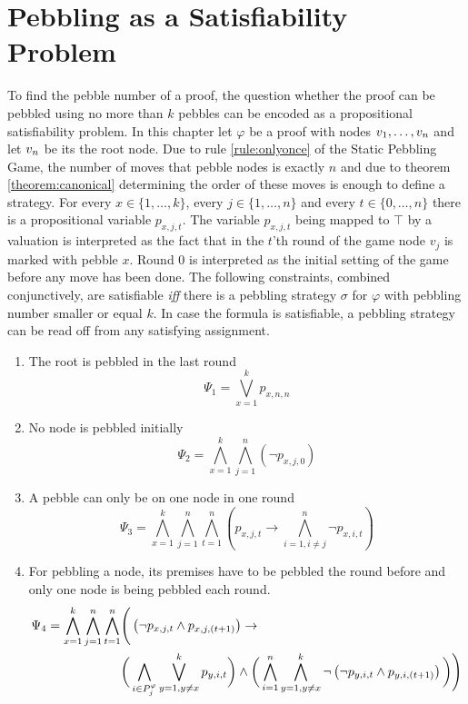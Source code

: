 \section{Pebbling as a Satisfiability Problem}
\label{sec:pebblingSAT}

To find the pebble number of a proof, the question whether the proof can be pebbled using no more than $k$ pebbles can be encoded as a propositional satisfiability problem.
In this chapter let $\varphi$ be a proof with nodes $v_1,\ldots,v_n$ and let $v_n$ be its the root node. 
Due to rule \ref{rule:onlyonce} of the Static Pebbling Game, the number of moves that pebble nodes is exactly $n$ and due to theorem \ref{theorem:canonical} determining the order of these moves is enough to define a strategy. 
For every $x \in \{1,\ldots,k\}$, every $j \in \{1,\ldots,n\}$ and every $t \in \{0,\ldots,n\}$ there is a propositional variable $p_{x,j,t}$. 
The variable $p_{x,j,t}$ being mapped to $\top$ by a valuation is interpreted as the fact that in the $t$'th round of the game node $v_j$ is marked with pebble $x$.
Round $0$ is interpreted as the initial setting of the game before any move has been done.
The following constraints, combined conjunctively, are satisfiable \textit{iff} there is a pebbling strategy $\sigma$ for $\varphi$ with pebbling number smaller or equal $k$. 
In case the formula is satisfiable, a pebbling strategy can be read off from any satisfying assignment.

\begin{enumerate}
	\item The root is pebbled in the last round
				$$\Psi_1 = \bigvee_{x = 1}^k p_{x,n,n}$$
				
	\item No node is pebbled initially\\
				$$\Psi_2 = \bigwedge_{x = 1}^k \bigwedge_{j = 1}^n \left(\neg p_{x,j,0} \right)$$

	\item A pebble can only be on one node in one round
				$$\Psi_3 = \bigwedge_{x = 1}^k \bigwedge_{j = 1}^n \bigwedge_{t = 1}^n \left( p_{x,j,t} \rightarrow \bigwedge_{i = 1, i \neq j}^n \neg p_{x,i,t} \right)$$ 
				
	\item \label{c:pebble} For pebbling a node, its premises have to be pebbled the round before and only one node is being pebbled each round.\\
				\begin{align*}
					\Psi_4 = \bigwedge_{x = 1}^k \bigwedge_{j = 1}^n \bigwedge_{t = 1}^n & \Bigg( \left(\neg p_{x,j,t} \wedge p_{x,j,(t+1)} \right)\rightarrow \\
					&\bigg( \bigwedge_{i \in P_{j}^{\varphi}} \bigvee_{y = 1, y \neq x}^k p_{y,i,t} \bigg) \wedge 
					\bigg( \bigwedge_{i = 1}^n \bigwedge_{y = 1, y \neq x}^k \neg \left( \neg p_{y,i,t} \wedge p_{y,i,(t+1)} \right) \bigg) \Bigg)
				\end{align*}
				
\end{enumerate}


